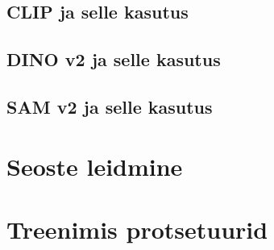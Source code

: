 \subsection{CLIP ja selle kasutus}

\subsection{DINO v2 ja selle kasutus}


\subsection{SAM v2  ja selle kasutus}


\section{Seoste leidmine}

\section{Treenimis protsetuurid}